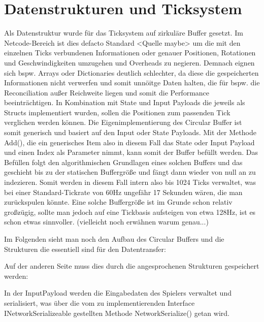 \section{Datenstrukturen und Ticksystem}
Als Datenstruktur wurde für das Ticksystem auf zirkuläre Buffer gesetzt. Im Netcode-Bereich ist dies defacto Standard <Quelle maybe> um die mit den einzelnen Ticks verbundenen Informationen oder genauer Positionen, Rotationen und Geschwindigkeiten umzugehen und Overheads zu negieren.
Demnach eignen sich bspw. Arrays oder Dictionaries deutlich schlechter, da diese die gespeicherten Informationen nicht verwerfen und somit unnöitge Daten halten, die für bspw. die Reconciliation außer Reichweite liegen und somit die Performance beeinträchtigen.
In Kombination mit State und Input Payloads die jeweils als Structs implementiert wurden, sollen die Positionen zum passenden Tick verglichen werden können.
Die Eigenimplementierung des Circular Buffer ist somit generisch und basiert auf den Input oder State Payloads. Mit der Methode Add(), die ein generisches Item also in diesem Fall das State oder Input Payload und einen Index als Parameter nimmt, kann somit der Buffer befüllt werden.
Das Befüllen folgt den algorithmischen Grundlagen eines solchen Buffers und das geschieht bis zu der statischen Buffergröße und fängt dann wieder von null an zu indezieren. 
Somit werden in diesem Fall intern also bis 1024 Ticks verwaltet, was bei einer Standard-Tickrate von 60Hz ungefähr 17 Sekunden wären, die man zurückspulen könnte.
Eine solche Buffergröße ist im Grunde schon relativ großzügig, sollte man jedoch auf eine Tickbasis aufsteigen von etwa 128Hz, ist es schon etwas sinnvoller.  (vielleicht noch erwähnen warum genau...) 

\newpage

Im Folgenden sieht man noch den Aufbau des Circular Buffers und die Strukturen die essentiell sind für den Datentransfer:


\newpage
Auf der anderen Seite muss dies durch die angesprochenen Strukturen gespeichert werden:

In der InputPayload werden die Eingabedaten des Spielers verwaltet und serialisiert, was über die vom zu implementierenden Interface INetworkSerializeable gestellten Methode NetworkSerialize() getan wird.

